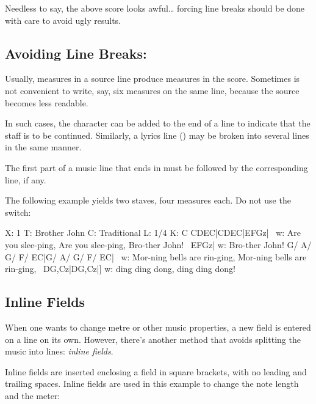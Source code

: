 \documentclass[a4paper,fullpage,12pt]{book}
\begin{document}

Needless to say, the above score looks awful{\ldots} forcing line
breaks should be done with care to avoid ugly results.


\subsection{Avoiding Line Breaks: \icmd{\textbackslash{}}}
\label{sec:battute}

Usually,  measures in a source line produce  measures
in the score. Sometimes is not convenient to write, say, six measures
on the same line, because the source becomes less readable.

In such cases, the \car{\bl} character can be added to the end of a
line to indicate that the staff is to be continued. Similarly, a
lyrics line () may be broken into several lines in the same
manner.

The first part of a music line that ends in \car{\bl} must be followed
by the corresponding  line, if any.

The following example yields two staves, four measures each. Do not
use the  switch:

\begin{abcsource}
X: 1
T: Brother John
C: Traditional
L: 1/4
K: C
CDEC|CDEC|EFGz|\ %
w: Are you slee-ping, Are you slee-ping, Bro-ther John!\ %
EFGz|
w: Bro-ther John!
G/ A/ G/ F/ EC|G/ A/ G/ F/ EC|\ %
w: Mor-ning bells are rin-ging, Mor-ning bells are rin-ging,\ %
DG,Cz|DG,Cz|]
w: ding ding dong, ding ding dong!
\end{abcsource}



\subsection{Inline Fields}
\label{sec:inline}

When one wants to change metre or other music properties, a new field
is entered on a line on its own. However, there's another method that
avoids splitting the music into lines: \emph{inline fields}.

Inline fields are inserted enclosing a field in square brackets, with
no leading and trailing spaces. Inline fields are used in this example
to change the note length and the meter:
\end{document}
